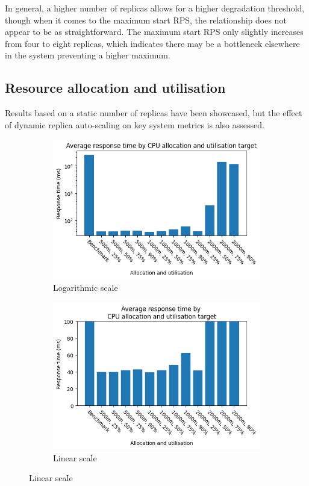 In general, a higher number of replicas allows for a higher degradation threshold, though when it comes to the maximum start RPS, the relationship does not appear to be as straightforward. The maximum start RPS only slightly increases from four to eight replicas, which indicates there may be a bottleneck elsewhere in the system preventing a higher maximum.

\subsection{Resource allocation and utilisation}

Results based on a static number of replicas have been showcased, but the effect of dynamic replica auto-scaling on key system metrics is also assessed.

\begin{figure}[h]
    \centering
    \begin{subfigure}{.5\textwidth}
      \centering
      \includegraphics[width=\linewidth]{figures/uor-rau-spike-avg-response-time.png}
      \caption{Logarithmic scale}
    \end{subfigure}%
    \begin{subfigure}{.5\textwidth}
      \centering
      \includegraphics[width=\linewidth]{figures/uor-rau-spike-avg-response-time-2.png}
      \caption{Linear scale}
    \end{subfigure}


\end{figure}

